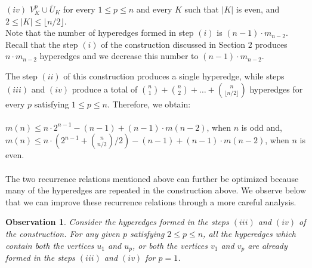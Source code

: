 \documentclass[11pt]{article}
\newtheorem{observation}[lemma]{Observation}
\begin{document}
$(iv)$ $V_K^p \cup {\bar{U}}_K$ for every $1 \leq p \leq n$ and every $K$ such that $|K|$ is even, and $2 \leq |K| \leq \lfloor n/2 \rfloor$. \\

Note that the number of hyperedges formed in step $(i)$ is $(n-1) \cdot m_{n-2}$.
Recall that the step $(i)$ of the construction discussed in Section $2$ produces $n \cdot m_{n-2}$ hyperedges and we decrease this number to $(n-1) \cdot m_{n-2}$.

The step $(ii)$ of this construction produces a single hyperedge, while steps $(iii)$ and $(iv)$ produce a total of $\binom{n}{1} + \binom{n}{2} + \ldots + \binom{n}{\lfloor{n/2}\rfloor}$ hyperedges for every $p$ satisfying $1 \leq p \leq n$.
Therefore, we obtain:\\\\
$m(n) \leq n \cdot 2^{n-1} - (n-1) + (n-1) \cdot m(n-2)$, when $n$ is odd and,\\
$m(n) \leq n \cdot (2^{n-1} + {n \choose {n / 2}}/{2}) - (n-1) + (n-1) \cdot m(n-2)$, when $n$ is even.

\paragraph*{}

The two recurrence relations mentioned above can further be optimized because many of the hyperedges are repeated in the construction above. We observe below that we can improve these recurrence relations through a more careful analysis. 

\begin{observation}
Consider the hyperedges formed in the steps $(iii)$ and $(iv)$ of the construction. For any given $p$ satisfying $2 \leq p \leq n$, all the hyperedges which contain both the vertices $u_1$ and $u_p$, or both the vertices $v_1$ and $v_p$ are already formed in the steps $(iii)$ and $(iv)$ for $p = 1$.
\end{observation}
\end{document}

